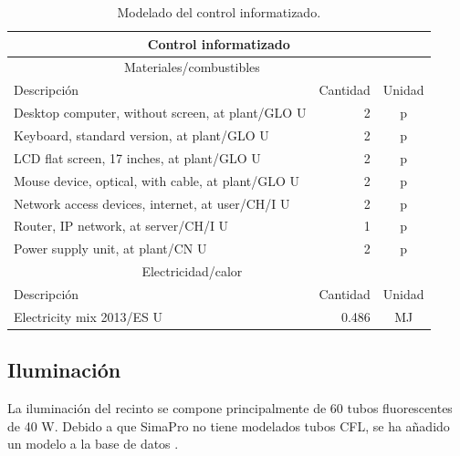 \begin{table}[!htb]
\centering
\begin{tabular}{p{8cm}rc}
\toprule
\multicolumn{3}{c}{Control informatizado}\\
\midrule
\multicolumn{2}{c}{Materiales/combustibles}\\
\cmidrule(r){1-2}
Descripción & Cantidad & Unidad\\
\midrule
Desktop computer, without screen, at plant/GLO U & 2 & p\\
Keyboard, standard version, at plant/GLO U & 2 & p\\
LCD flat screen, 17 inches, at plant/GLO U & 2 & p\\
Mouse device, optical, with cable, at plant/GLO U & 2 & p\\
Network access devices, internet, at user/CH/I U & 2 & p\\
Router, IP network, at server/CH/I U & 1 & p\\
Power supply unit, at plant/CN U & 2 & p\\
\midrule
\multicolumn{2}{c}{Electricidad/calor}\\
\cmidrule(r){1-2}
Descripción & Cantidad & Unidad\\
\midrule
Electricity mix 2013/ES U & 0.486 & \si{MJ}\\
\bottomrule
\end{tabular}
\caption{Modelado del control informatizado.}
\label{modeladodecontrol}
\end{table}

\subsection{Iluminación}

La iluminación del recinto se compone principalmente de 60 tubos fluorescentes de 40 \si{W}. Debido a que SimaPro no tiene modelados tubos CFL, se ha añadido un modelo a la base de datos \cite{cflbulb}.

